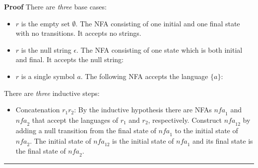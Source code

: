 \documentclass[12pt,a4paper]{article}
\newcommand*{\qed}{\hfill\rule[-2pt]{4pt}{10pt}}
\newenvironment{proof}{\textbf{Proof}}{\qed}
\begin{document}
\begin{proof}
There are \emph{three} base cases:
\begin{itemize}
\item $r$ is the empty set $\emptyset$. The NFA consisting of one initial and one final state with no transitions. It accepts no strings.
\begin{center}
\end{center}
\item $r$ is the null string $\epsilon$. The NFA consisting of one state which is both initial and final. It accepts the null string:
\begin{center}
\end{center}
\item $r$ is a single symbol $a$. The following NFA accepts the language $\{a\}$:
\begin{center}
\end{center}
\end{itemize}
There are \emph{three} inductive steps:
\begin{itemize}
\item Concatenation $r_1r_2$: By the inductive hypothesis there are NFAs $\mathit{nfa}_1$ and $\mathit{nfa}_2$ that accept the languages of $r_1$ and $r_2$, respectively. Construct $\mathit{nfa}_{12}$ by adding a null transition from the final state of $\mathit{nfa}_1$ to the initial state of $\mathit{nfa}_2$. The initial state of $\mathit{nfa}_{12}$ is the initial state of $\mathit{nfa}_1$ and its final state is the final state of $\mathit{nfa}_2$.
\begin{center}

\end{center}
\end{itemize}
\end{proof}
\end{document}
